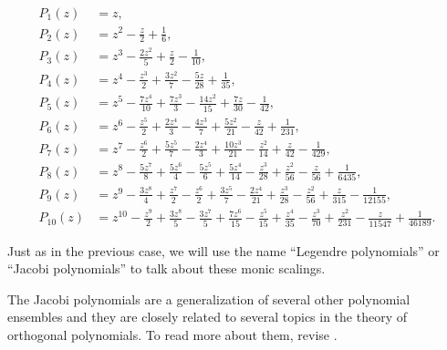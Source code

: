     \begin{align*}
        P_1(z) &= z,\\
        P_2(z) &= z^2 - \frac{z}{2} + \frac{1}{6}, \\
        P_3(z) &= z^3 - \frac{2z^2}{5} + \frac{z}{2} - \frac{1}{10},\\
        P_4(z) &= z^4 - \frac{z^3}{2} + \frac{3z^2}{7} - \frac{5z}{28} + \frac{1}{35},\\
        P_5(z) &= z^5 - \frac{7z^4}{10} + \frac{7z^3}{3} - \frac{14z^2}{15} + \frac{7z}{30} - \frac{1}{42},\\
        P_6(z) &= z^6 - \frac{z^5}{2} + \frac{2z^4}{3} - \frac{4z^3}{7} + \frac{5z^2}{21} - \frac{z}{42} + \frac{1}{231},\\
        P_7(z) &= z^7 - \frac{z^6}{2} + \frac{5z^5}{7} - \frac{2z^4}{3} + \frac{10z^3}{21} - \frac{z^2}{14} + \frac{z}{42} - \frac{1}{429},\\
        P_8(z) &= z^8 - \frac{5z^7}{8} + \frac{5z^6}{4} - \frac{5z^5}{6} + \frac{5z^4}{14} - \frac{z^3}{28} + \frac{z^2}{56} - \frac{z}{56} + \frac{1}{6435},\\
        P_9(z) &= z^9 - \frac{3z^8}{4} + \frac{z^7}{2} - \frac{z^6}{2} + \frac{3z^5}{7} - \frac{2z^4}{21} + \frac{z^3}{28} - \frac{z^2}{56} + \frac{z}{315} - \frac{1}{12155},\\
        P_{10}(z) &= z^{10} - \frac{z^9}{2} + \frac{3z^8}{5} - \frac{3z^7}{5} + \frac{7z^6}{15} - \frac{z^5}{15} + \frac{z^4}{35} - \frac{z^3}{70} + \frac{z^2}{231} - \frac{z}{11547} + \frac{1}{46189}.
    \end{align*}


    Just as in the previous case, we will use the name ``Legendre polynomials'' or ``Jacobi polynomials'' to talk about these monic scalings.

    The Jacobi polynomials are a generalization of several other polynomial ensembles and they are closely related to several topics in the theory of orthogonal polynomials. To read more about them, revise \cite[Chapter IV]{szeg1939orthogonal}.